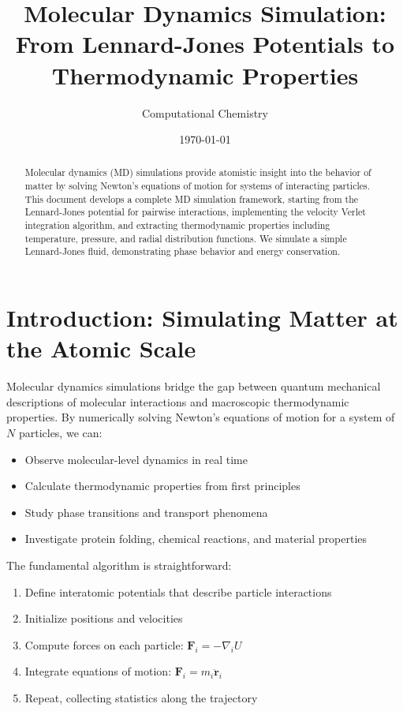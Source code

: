 \documentclass[11pt,a4paper]{article}
\title{Molecular Dynamics Simulation:\\From Lennard-Jones Potentials to Thermodynamic Properties}
\author{Computational Chemistry}
\date{\today}
\newcommand{\vect}[1]{\mathbf{#1}}
\begin{document}
\maketitle

\begin{abstract}
Molecular dynamics (MD) simulations provide atomistic insight into the behavior of matter by solving Newton's equations of motion for systems of interacting particles. This document develops a complete MD simulation framework, starting from the Lennard-Jones potential for pairwise interactions, implementing the velocity Verlet integration algorithm, and extracting thermodynamic properties including temperature, pressure, and radial distribution functions. We simulate a simple Lennard-Jones fluid, demonstrating phase behavior and energy conservation.
\end{abstract}

\tableofcontents
\newpage

\section{Introduction: Simulating Matter at the Atomic Scale}

Molecular dynamics simulations bridge the gap between quantum mechanical descriptions of molecular interactions and macroscopic thermodynamic properties. By numerically solving Newton's equations of motion for a system of $N$ particles, we can:

\begin{itemize}
    \item Observe molecular-level dynamics in real time
    \item Calculate thermodynamic properties from first principles
    \item Study phase transitions and transport phenomena
    \item Investigate protein folding, chemical reactions, and material properties
\end{itemize}

The fundamental algorithm is straightforward:
\begin{enumerate}
    \item Define interatomic potentials that describe particle interactions
    \item Initialize positions and velocities
    \item Compute forces on each particle: $\vect{F}_i = -\nabla_i U$
    \item Integrate equations of motion: $\vect{F}_i = m_i \ddot{\vect{r}}_i$
    \item Repeat, collecting statistics along the trajectory
\end{enumerate}
\end{document}
